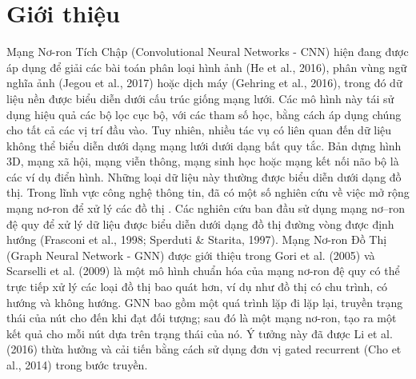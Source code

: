 \chapter{Giới thiệu}
\label{chap:Giới thiệu}


Mạng Nơ-ron Tích Chập (Convolutional Neural Networks - CNN) hiện đang được áp dụng để giải các bài toán phân loại hình ảnh (He et al., 2016), phân vùng ngữ nghĩa ảnh (Jegou et al., 2017) hoặc dịch máy (Gehring et al., 2016), trong đó dữ liệu nền được biểu diễn dưới cấu trúc giống mạng lưới. Các mô hình này tái sử dụng hiệu quả các bộ lọc cục bộ, với các tham số học, bằng cách áp dụng chúng cho tất cả các vị trí đầu vào.
Tuy nhiên, nhiều tác vụ có liên quan đến dữ liệu không thể biểu diễn dưới dạng mạng lưới dưới dạng bất quy tắc. Bản dựng hình 3D, mạng xã hội, mạng viễn thông, mạng sinh học hoặc mạng kết nối não bộ là các ví dụ điển hình. Những loại dữ liệu này thường được biểu diễn dưới dạng đồ thị.
Trong lĩnh vực công nghệ thông tin, đã có một số nghiên cứu về việc mở rộng mạng nơ-ron để xử lý các đồ thị . Các nghiên cứu ban đầu sử dụng mạng nơ–ron đệ quy để xử lý dữ liệu được biểu diễn dưới dạng đồ thị đường vòng được định hướng (Frasconi et al., 1998; Sperduti & Starita, 1997). Mạng Nơ-ron Đồ Thị (Graph Neural Network - GNN) được giới thiệu trong Gori et al. (2005) và Scarselli et al. (2009) là một mô hình chuẩn hóa của mạng nơ-ron đệ quy có thể trực tiếp xử lý các loại đồ thị bao quát hơn, ví dụ như đồ thị có chu trình, có hướng và không hướng. GNN bao gồm một quá trình lặp đi lặp lại, truyền trạng thái của nút cho đến khi đạt đối tượng; sau đó là một mạng nơ-ron, tạo ra một kết quả cho mỗi nút dựa trên trạng thái của nó. Ý tưởng này đã được Li et al. (2016) thừa hưởng và cải tiến bằng cách sử dụng đơn vị gated recurrent (Cho et al., 2014) trong bước truyền.


